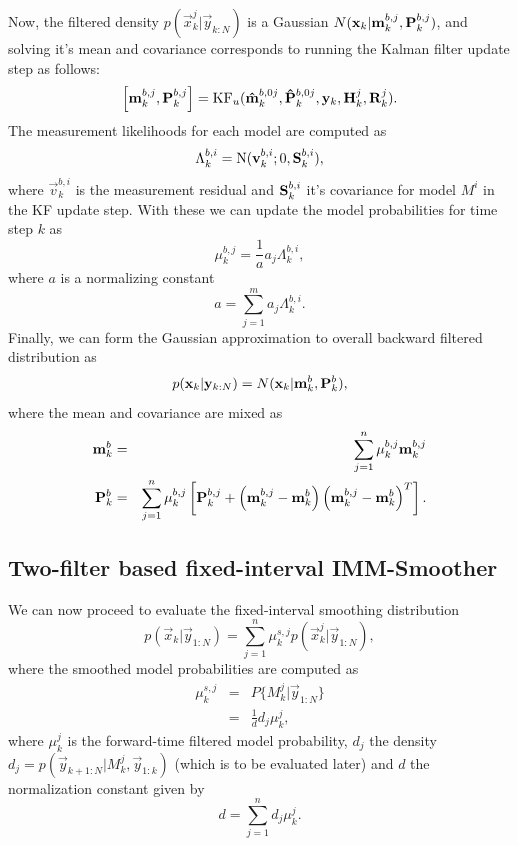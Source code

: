 Now, the filtered density $p(\vec{x}_k^j|\vec{y}_{k:N})$ is a Gaussian
$N(\mathbf{x}_k|\mathbf{m}_{k}^{b,j},\mathbf{P}_{k}^{b,j})$, and solving it's
mean and covariance corresponds to running the Kalman filter update
step as follows:
%
\begin{equation}
%
  \left[\vec{m}_{k}^{b,j},\mat{P}_{k}^{b,j}\right] =
\text{KF}_u(\vec{\hat{m}}_{k}^{b,0j},\mat{\hat{P}}_{k}^{b,0j},\vec{y}_k,\mat{H}_k^j,\mat{R}_k^j). \label{eq:imm_b_update}
%
\end{equation}
%
The measurement likelihoods for each model are computed as
% 
\begin{equation}
  \Lambda_k^{b,i} = \text{N}(\mathbf{v}_k^{b,i};0,\mathbf{S}_k^{b,i}),
\end{equation}
where $\vec{v}_k^{b,i}$ is the measurement residual and
$\mathbf{S}_k^{b,i}$ it's covariance for model $M^i$ in the KF update
step.
%
With these we can update the model probabilities for time step $k$ as
%
\begin{equation}
%
\mu_k^{b,j} = \frac{1}{a} a_j \Lambda_k^{b,i},
%
\end{equation}
%
where $a$ is a normalizing constant
%
\begin{equation}
%
a = \sum_{j=1}^{m} a_j \Lambda_k^{b,i}.
%
\end{equation}
%
Finally, we can form the Gaussian approximation to overall backward
filtered distribution as
%
\begin{equation}
%
p(\vec{x}_k|\vec{y}_{k:N}) = N(\vec{x}_k|\vec{m}_k^b,\mat{P}_{k}^b),
%
\end{equation}
%
where the mean and covariance are mixed as
%
\begin{eqnarray}
%
\vec{m}_k^b & = & \sum_{j=1}^n \mu_k^{b,j} \vec{m}_k^{b,j} \\
%
\mat{P}_{k}^b & = & \sum_{j=1}^{n} \mu_k^{b,j} \left[ \mat{P}_k^{b,j}
+ \left( \vec{m}_k^{b,j} - \vec{m}_k^{b} \right) \left(
\vec{m}_k^{b,j} - \vec{m}_k^{b}\right)^T \right].
%
\end{eqnarray}
%

\subsection{Two-filter based fixed-interval IMM-Smoother}

We can now proceed to evaluate the fixed-interval smoothing
distribution
%
\begin{equation}
%
p(\vec{x}_k|\vec{y}_{1:N}) = \sum_{j=1}^n \mu_k^{s,j}
p(\vec{x}_k^j|\vec{y}_{1:N}), \label{eq:imm_smooth_density}
%
\end{equation}
%
where the smoothed model probabilities are computed as
%
\begin{eqnarray}
%
\mu_k^{s,j} & = & P\{ M_k^j|\vec{y}_{1:N}\} \\ & = & \frac{1}{d} d_j
\mu_k^j,
%
\end{eqnarray}
%
where $\mu_k^j$ is the forward-time filtered model probability, $d_j$
the density $d_j = p(\vec{y}_{k+1:N}|M_k^j,\vec{y}_{1:k})$ (which is
to be evaluated later) and $d$ the normalization constant given by
%  
\begin{equation}
%
d = \sum_{j=1}^{n} d_j \mu_k^j.
%
\end{equation}
%

